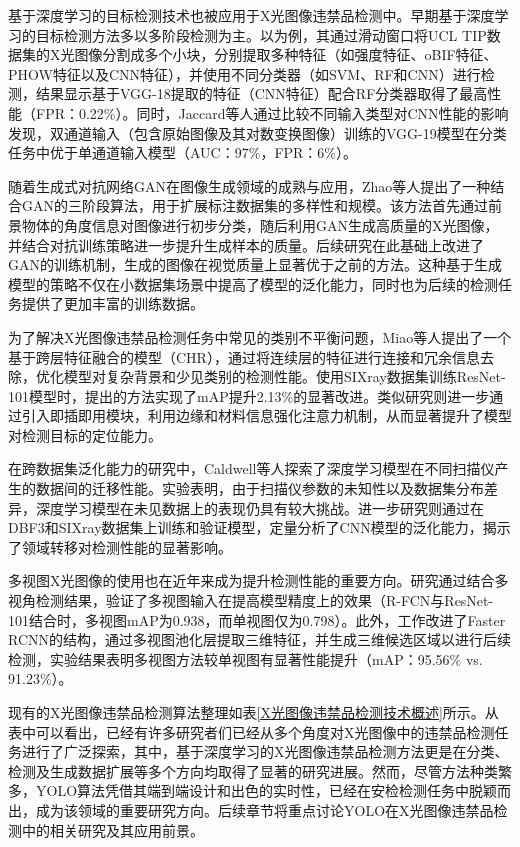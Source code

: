 \documentclass[11pt,twocolumn]{ctexart}
\begin{document}
基于深度学习的目标检测技术也被应用于X光图像违禁品检测中。早期基于深度学习的目标检测方法多以多阶段检测为主。以\cite{jaccard2017detection}为例，其通过滑动窗口将UCL TIP数据集的X光图像分割成多个小块，分别提取多种特征（如强度特征、oBIF特征\cite{griffin2009basic}、PHOW特征\cite{bosch2007representing}以及CNN特征），并使用不同分类器（如SVM、RF和CNN）进行检测，结果显示基于VGG-18提取的特征（CNN特征）配合RF分类器取得了最高性能（FPR：0.22\%）。同时，Jaccard等人\cite{jaccard2016automated}通过比较不同输入类型对CNN性能的影响发现，双通道输入（包含原始图像及其对数变换图像）训练的VGG-19模型在分类任务中优于单通道输入模型（AUC：97\%，FPR：6\%）。

随着生成式对抗网络GAN在图像生成领域的成熟与应用，Zhao等人\cite{zhao2018gan}提出了一种结合GAN的三阶段算法，用于扩展标注数据集的多样性和规模。该方法首先通过前景物体的角度信息对图像进行初步分类，随后利用GAN生成高质量的X光图像，并结合对抗训练策略进一步提升生成样本的质量。后续研究\cite{yang2019data}在此基础上改进了GAN的训练机制，生成的图像在视觉质量上显著优于之前的方法。这种基于生成模型的策略不仅在小数据集场景中提高了模型的泛化能力，同时也为后续的检测任务提供了更加丰富的训练数据。

为了解决X光图像违禁品检测任务中常见的类别不平衡问题，Miao等人\cite{miao2019sixray}提出了一个基于跨层特征融合的模型（CHR），通过将连续层的特征进行连接和冗余信息去除，优化模型对复杂背景和少见类别的检测性能。使用SIXray数据集训练ResNet-101模型时，提出的方法实现了mAP提升2.13\%的显著改进。类似研究\cite{wei2020occluded}则进一步通过引入即插即用模块，利用边缘和材料信息强化注意力机制，从而显著提升了模型对检测目标的定位能力。

在跨数据集泛化能力的研究中，Caldwell等人\cite{caldwell2017transferring}探索了深度学习模型在不同扫描仪产生的数据间的迁移性能。实验表明，由于扫描仪参数的未知性以及数据集分布差异，深度学习模型在未见数据上的表现仍具有较大挑战。进一步研究\cite{gaus2019evaluating}则通过在DBF3和SIXray数据集上训练和验证模型，定量分析了CNN模型的泛化能力，揭示了领域转移对检测性能的显著影响。

多视图X光图像的使用也在近年来成为提升检测性能的重要方向。研究\cite{liang2018automatic}通过结合多视角检测结果，验证了多视图输入在提高模型精度上的效果（R-FCN与ResNet-101结合时，多视图mAP为0.938，而单视图仅为0.798）。此外，工作\cite{steitz2018multi}改进了Faster RCNN的结构，通过多视图池化层提取三维特征，并生成三维候选区域以进行后续检测，实验结果表明多视图方法较单视图有显著性能提升（mAP：95.56\% vs. 91.23\%）。

现有的X光图像违禁品检测算法整理如表\ref{X光图像违禁品检测技术概述}所示。从表中可以看出，已经有许多研究者们已经从多个角度对X光图像中的违禁品检测任务进行了广泛探索，其中，基于深度学习的X光图像违禁品检测方法更是在分类、检测及生成数据扩展等多个方向均取得了显著的研究进展。然而，尽管方法种类繁多，YOLO算法凭借其端到端设计和出色的实时性，已经在安检检测任务中脱颖而出，成为该领域的重要研究方向。后续章节将重点讨论YOLO在X光图像违禁品检测中的相关研究及其应用前景。
\end{document}
